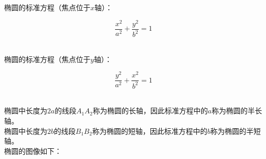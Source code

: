 \documentclass[UTF8]{ctexart}
\begin{document}
\newpage

    椭圆的标准方程（焦点位于$x$轴）：
    \begin{large}
        \begin{equation*}
            \frac{x^2}{a^2}+\frac{y^2}{b^2}=1
        \end{equation*}
    \end{large}\\
    椭圆的标准方程（焦点位于$y$轴）：
    \begin{large}
        \begin{equation*}
            \frac{y^2}{a^2}+\frac{x^2}{b^2}=1
        \end{equation*}
    \end{large}\\
    椭圆中长度为$2a$的线段$A_1A_2$称为椭圆的长轴，因此标准方程中的$a$称为椭圆的半长轴。\\[3mm]
    椭圆中长度为$2b$的线段$B_1B_2$称为椭圆的短轴，因此标准方程中的$b$称为椭圆的半短轴。\\[5mm]
    椭圆的图像如下：
\end{document}
